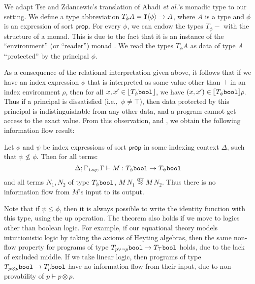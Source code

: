 We adapt Tse and Zdancewic's translation of Abadi \emph{et al.}'s monadic
type to our setting. We define a type abbreviation $T_\phi A =
\textup{\texttt{T}}\langle \phi \rangle \to A$, where $A$ is a type and $\phi$ is an
expression of sort $\mathsf{prop}$. For every $\phi$, we can endow the
types $T_\phi-$ with the structure of a monad. This is due to the fact
that it is an instance of the ``environment'' (or ``reader'') monad
\cite{jones95functional}. We read the types $T_\phi A$ as data of type
$A$ ``protected'' by the principal $\phi$.

As a consequence of the relational interpretation given above, it
follows that if we have an index expression $\phi$ that is interpreted
as some value other than $\top$ in an index environment $\rho$,
then for all $x,x' \in \left\lfloor T_\phi\textup{\texttt{bool}} \right\rfloor$, we have $(x,x')
\in \llbracket T_\phi\textup{\texttt{bool}} \rrbracket{\rho}$. Thus if a principal is
dissatisfied (i.e.,~$\phi \not= \top$), then data protected by this
principal is indistinguishable from any other data, and a program
cannot get access to the exact value. From this observation, and
, we obtain the following information flow
result:

\begin{theorem}
  Let $\phi$ and $\psi$ be index expressions of sort $\mathsf{prop}$
  in some indexing context $\Delta$, such that $\psi \not\leq
  \phi$. Then for all terms:
  \begin{displaymath}
    \Delta; \Gamma_{\mathit{Log}},\Gamma \vdash M : T_\phi\textup{\texttt{bool}} \to T_\psi\textup{\texttt{bool}}
  \end{displaymath}
  and all terms $N_1,N_2$ of type $T_\phi\textup{\texttt{bool}}$, $M\ N_1
  \stackrel{ctx}\approx M\ N_2$.  Thus there is no information flow
  from $M$'s input to its output.
\end{theorem}
Note that if $\psi \leq \phi$, then it is always possible to write the
identity function with this type, using the $\mathrm{up}$ operation.
The theorem also holds if we move to logics other than boolean
logic. For example, if our equational theory models intuitionistic
logic by taking the axioms of Heyting algebras, then the same non-flow
property for programs of type $T_{p\lor\lnot p}\textup{\texttt{bool}} \to
T_\top\textup{\texttt{bool}}$ holds, due to the lack of excluded middle. If
we take linear logic, then programs of type $T_{p\otimes
  p}\textup{\texttt{bool}} \to T_p\textup{\texttt{bool}}$ have no information flow
from their input, due to non-provability of $p \vdash p \otimes p$.


